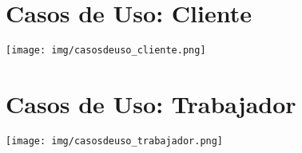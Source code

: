 \section*{\bfseries\LARGE Casos de Uso: Cliente}
\begin{center}
    \texttt{[image: img/casosdeuso\_cliente.png]}  
\end{center}

\section*{\bfseries\LARGE Casos de Uso: Trabajador}\begin{center}
    \texttt{[image: img/casosdeuso\_trabajador.png]}  
\end{center}